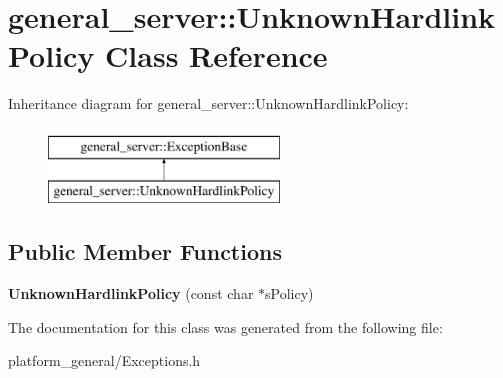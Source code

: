 \hypertarget{classgeneral__server_1_1UnknownHardlinkPolicy}{\section{general\-\_\-server\-:\-:\-Unknown\-Hardlink\-Policy \-Class \-Reference}
\label{classgeneral__server_1_1UnknownHardlinkPolicy}
}
\-Inheritance diagram for general\-\_\-server\-:\-:\-Unknown\-Hardlink\-Policy\-:\begin{figure}[H]
\begin{center}
\leavevmode
\includegraphics[height=2.000000cm]{classgeneral__server_1_1UnknownHardlinkPolicy}
\end{center}
\end{figure}
\subsection*{\-Public \-Member \-Functions}
\begin{DoxyCompactItemize}
\item 
\hypertarget{classgeneral__server_1_1UnknownHardlinkPolicy_abf546f246dc5bb55ff1fb18ebea938c5}{{\bfseries \-Unknown\-Hardlink\-Policy} (const char $\ast$s\-Policy)}\label{classgeneral__server_1_1UnknownHardlinkPolicy_abf546f246dc5bb55ff1fb18ebea938c5}

\end{DoxyCompactItemize}


\-The documentation for this class was generated from the following file\-:\begin{DoxyCompactItemize}
\item 
platform\-\_\-general/\-Exceptions.\-h\end{DoxyCompactItemize}
